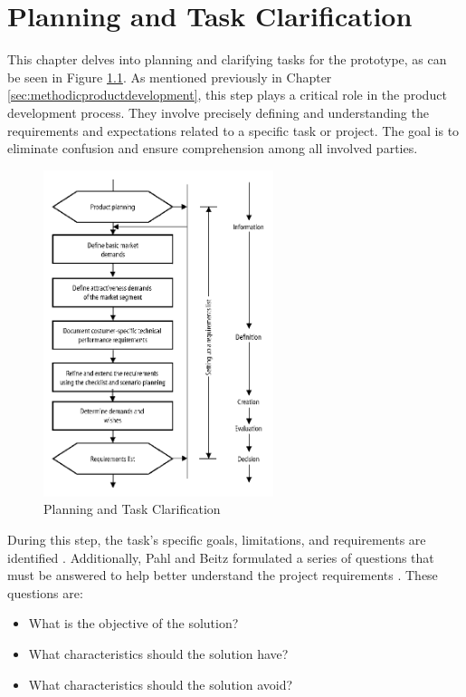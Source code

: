 \chapter{Planning and Task Clarification}
\label{ch:planning}

This chapter delves into planning and clarifying tasks for the prototype, as can be seen in Figure \ref{fig:planning}. As mentioned previously in Chapter \ref{sec:methodicproductdevelopment}, this step plays a critical role in the product development process. They involve precisely defining and understanding the requirements and expectations related to a specific task or project. The goal is to eliminate confusion and ensure comprehension among all involved parties.

\begin{figure}[ht!]
    \centering
    \includegraphics[width=0.6\textwidth]{texs/Part1/chapter2/image/planning.png}
    \caption{Planning and Task Clarification \cite[146]{Pahl2007}}
    \label{fig:planning}
\end{figure}

During this step, the task's specific goals, limitations, and requirements are identified \cite[145]{Pahl2007}. Additionally, Pahl and Beitz formulated a series of questions that must be answered to help better understand the project requirements \cite[145]{Pahl2007}. These questions are:

\begin{itemize}
    \item What is the objective of the solution?
    \item What characteristics should the solution have?
    \item What characteristics should the solution avoid?
\end{itemize}

